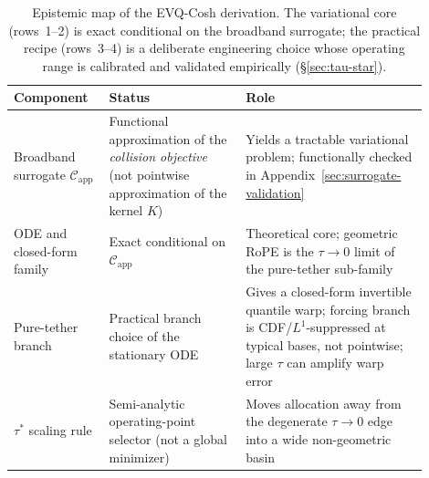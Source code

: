 \begin{table}[t]
\centering
\small
\caption{Epistemic map of the EVQ-Cosh derivation. The variational core (rows~1--2) is exact conditional on the broadband surrogate; the practical recipe (rows~3--4) is a deliberate engineering choice whose operating range is calibrated and validated empirically (\S\ref{sec:tau-star}).}
\label{tab:epistemic-map}
\begin{tabular}{p{0.20\linewidth} p{0.30\linewidth} p{0.40\linewidth}}
\toprule
Component & Status & Role \\
\midrule
Broadband surrogate $\mathcal{C}_{\mathrm{app}}$ & Functional approximation of the \emph{collision objective} (not pointwise approximation of the kernel $K$) & Yields a tractable variational problem; functionally checked in Appendix~\ref{sec:surrogate-validation} \\
ODE and closed-form family & Exact conditional on $\mathcal{C}_{\mathrm{app}}$ & Theoretical core; geometric RoPE is the $\tau{\to}0$ limit of the pure-tether sub-family \\
Pure-tether branch & Practical branch choice of the stationary ODE & Gives a closed-form invertible quantile warp; forcing branch is CDF/$L^1$-suppressed at typical bases, not pointwise; large $\tau$ can amplify warp error \\
$\tau^*$ scaling rule & Semi-analytic operating-point selector (not a global minimizer) & Moves allocation away from the degenerate $\tau{\to}0$ edge into a wide non-geometric basin \\
\bottomrule
\end{tabular}
\end{table}
